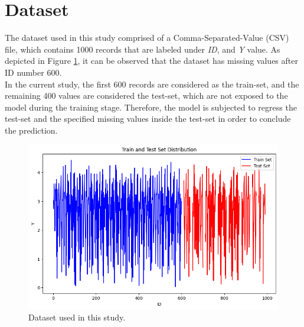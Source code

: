 \documentclass{article}
\begin{document}
\section{Dataset}
The dataset used in this study comprised of a Comma-Separated-Value (CSV) file, which contains 1000 records that are labeled under \textit{ID}, and \textit{Y} value. As depicted in Figure \ref{fig:dataset}, it can be observed that the dataset has missing values after ID number 600.\\ 
In the current study, the first 600 records are considered as the train-set, and the remaining 400 values are considered the test-set, which are not exposed to the model during the training stage. Therefore, the model is subjected to regress the test-set and the specified missing values inside the test-set in order to conclude the prediction.

\begin{figure}
\centering
\includegraphics[width=0.8\linewidth]{Fig01.png}
\caption{\label{fig:dataset} Dataset used in this study.}
\end{figure}
\end{document}
